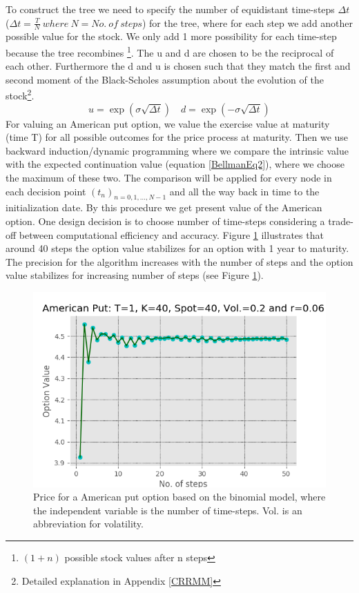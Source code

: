 To construct the tree we need to specify the number of equidistant time-steps $\Delta t$ ($\Delta t = \frac{T}{N} \ where \ N=No. \ of  \ steps$) for the tree, where for each step we add another possible value for the stock. We only add 1 more possibility for each time-step because the tree recombines \footnote{$(1+n)$ possible stock values after n steps}. The u and d are chosen to be the reciprocal of each other. Furthermore the d and u is chosen such that they match the first and second moment of the Black-Scholes assumption about the evolution of the stock\footnote{Detailed explanation in Appendix \ref{CRRMM}}.
$$u= \exp(\sigma \sqrt{\Delta t}) \quad d= \exp(-\sigma \sqrt{\Delta t})$$
For valuing an American put option, we value the exercise value at maturity (time T) for all possible outcomes for the price process at maturity. Then we use backward induction/dynamic programming where we compare the intrinsic value with the expected continuation value (equation \eqref{BellmanEq2}), where we choose the maximum of these two. The comparison will be applied for every node in each decision point $(t_{n})_{n=0,1,\ldots,N-1}$ and all the way back in time to the initialization date. By this procedure we get present value of the American option. One design decision is to choose number of time-steps considering a trade-off between computational efficiency and accuracy. Figure \ref{fig:binConv} illustrates that around 40 steps the option value stabilizes for an option with 1 year to maturity. The precision for the algorithm increases with the number of steps and the option value stabilizes for increasing number of steps (see Figure \ref{fig:binConv}).\\

\begin{figure}[th]
\centering
\includegraphics{Figures/binConv.png}
\decoRule
\caption[Convergence Of Binomial Model]{Price for a American put option based on the binomial model, where the independent variable is the number of time-steps. Vol. is an abbreviation for volatility.}
\label{fig:binConv}
\end{figure}

